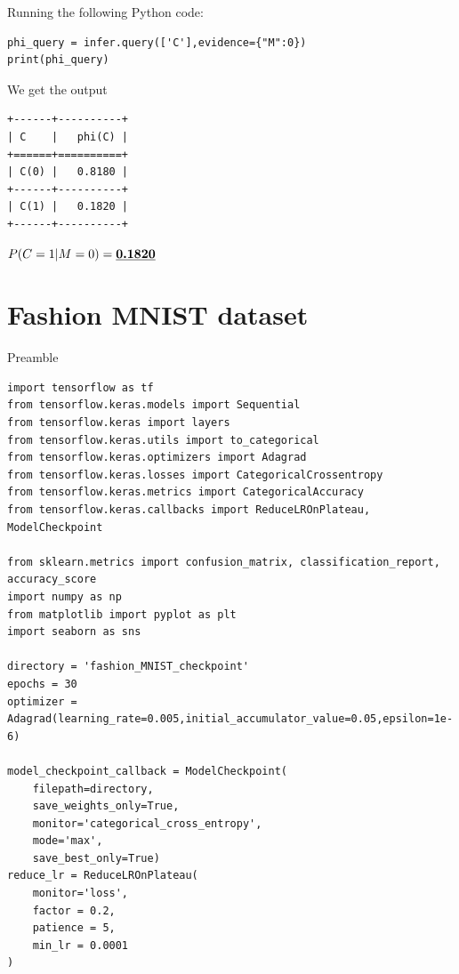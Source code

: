 \documentclass[12pt, letterpaper]{article}
\begin{document}
Running the following Python code:

\begin{mdframed}[backgroundcolor=bg]
\begin{verbatim}
phi_query = infer.query(['C'],evidence={"M":0})
print(phi_query)
\end{verbatim}
\end{mdframed}

We get the output

\begin{mdframed}[backgroundcolor=bg]
\begin{lstlisting}
+------+----------+
| C    |   phi(C) |
+======+==========+
| C(0) |   0.8180 |
+------+----------+
| C(1) |   0.1820 |
+------+----------+
\end{lstlisting}
\end{mdframed}

$P(C=1|M=0)=\textbf{\underline{0.1820}}$

\clearpage

\section{Fashion MNIST dataset}

{\large Preamble}

\begin{mdframed}[backgroundcolor=bg]
\begin{verbatim}
import tensorflow as tf
from tensorflow.keras.models import Sequential
from tensorflow.keras import layers
from tensorflow.keras.utils import to_categorical
from tensorflow.keras.optimizers import Adagrad
from tensorflow.keras.losses import CategoricalCrossentropy
from tensorflow.keras.metrics import CategoricalAccuracy
from tensorflow.keras.callbacks import ReduceLROnPlateau, ModelCheckpoint

from sklearn.metrics import confusion_matrix, classification_report, accuracy_score
import numpy as np
from matplotlib import pyplot as plt
import seaborn as sns

directory = 'fashion_MNIST_checkpoint'
epochs = 30
optimizer = Adagrad(learning_rate=0.005,initial_accumulator_value=0.05,epsilon=1e-6)

model_checkpoint_callback = ModelCheckpoint(
    filepath=directory,
    save_weights_only=True,
    monitor='categorical_cross_entropy',
    mode='max',
    save_best_only=True)
reduce_lr = ReduceLROnPlateau(
    monitor='loss',
    factor = 0.2,
    patience = 5,
    min_lr = 0.0001
)
\end{verbatim}
\end{mdframed}
\end{document}
